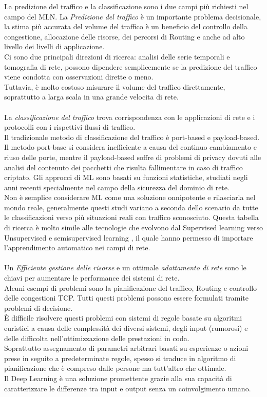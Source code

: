 \documentclass[../tesi.tex]{subfiles}
\begin{document}
La predizione del traffico e la classificazione sono i due campi più richiesti nel campo del MLN.
La \textit{Predizione del traffico} è un importante problema decisionale, la stima più accurata del volume del traffico è un beneficio del controllo della congestione, allocazione delle risorse, dei percorsi di Routing e anche ad alto livello dei livelli di applicazione.\\
Ci sono due principali direzioni di ricerca: analisi delle serie temporali e tomografia di rete, possono dipendere semplicemente se la predizione del traffico viene condotta con osservazioni dirette o meno.\\
Tuttavia, è molto costoso misurare il volume del traffico direttamente, soprattutto a larga scala in una grande velocita di rete.\\
\\
La \textit{classificazione del traffico} trova corrispondenza con le applicazioni di rete e i protocolli con i rispettivi flussi di traffico.\\
Il tradizionale metodo di classificazione del traffico è \Gls{port-based} e \Gls{payload-based}. Il metodo port-base si considera inefficiente a causa del continuo cambiamento e riuso delle porte, mentre il payload-based soffre di problemi di privacy dovuti alle analisi del contenuto dei pacchetti che risulta fallimentare in caso di traffico criptato.
Gli approcci di ML sono basati su funzioni statistiche, studiati negli anni recenti specialmente nel campo della sicurezza del dominio di rete.\\
Non è semplice considerare ML come una soluzione onnipotente e rilasciarla nel mondo reale, generalmente questi studi variano a seconda dello scenario da tutte le classificazioni verso più situazioni reali con traffico sconosciuto. Questa tabella di ricerca è molto simile alle tecnologie che evolvono dal Supervised learning verso Unsupervised e semisupervised learning , il quale hanno permesso di importare l’apprendimento automatico nei campi di rete.\\
\\
Un \textit{Efficiente gestione delle risorse} e un ottimale \textit{adattamento di rete} sono le chiavi per aumentare le performance dei sistemi di rete.\\ Alcuni esempi di problemi sono la pianificazione del traffico, Routing e controllo delle congestioni TCP. Tutti questi problemi possono essere formulati tramite problemi di decisione.\\
È difficile risolvere questi problemi con sistemi di regole basate su algoritmi euristici a causa delle complessità dei diversi sistemi, degli input (rumorosi) e delle difficolta nell’ottimizzazione delle prestazioni in coda.\\
Soprattutto assegnamento di parametri arbitrari basati su esperienze o azioni prese in seguito a predeterminate regole, spesso si traduce in algoritmo di pianificazione che è compreso dalle persone ma tutt’altro che ottimale.\\
Il \Gls{Deep Learning} è una soluzione promettente grazie alla sua capacità di caratterizzare le differenze tra input e output senza un coinvolgimento umano.
\end{document}
